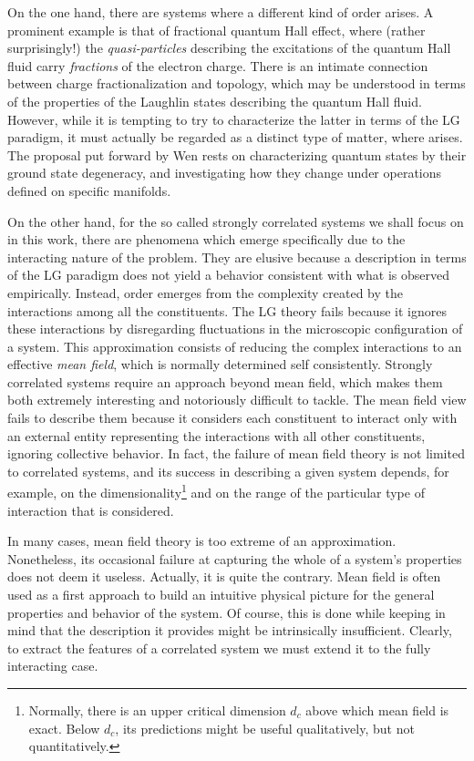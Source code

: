 On the one hand, there are systems where a different kind of order arises.
A prominent example is that of fractional quantum Hall effect, where (rather surprisingly!) the \emph{quasi-particles} describing the excitations of the quantum Hall fluid carry \emph{fractions} of the electron charge.
There is an intimate connection between charge fractionalization and topology, which may be understood in terms of the properties of the Laughlin states describing the quantum Hall fluid. However, while it is tempting to try to characterize the latter in terms of the \acs{LG} paradigm, it must actually be regarded as a distinct type of matter, where  arises.
The proposal put forward by Wen \cite{wen_topological_1990} rests on characterizing quantum states by their ground state degeneracy, and investigating how they change under operations defined on specific manifolds. 

On the other hand, for the so called strongly correlated systems we shall focus on in this work, there are phenomena which emerge specifically due to the interacting nature of the problem.
They are elusive because a description in terms of the \acs{LG} paradigm does not yield a behavior consistent with what is observed empirically.
Instead, order emerges from the complexity created by the interactions among all the constituents.
The \acs{LG} theory fails because it ignores these interactions by disregarding fluctuations in the microscopic configuration of a system.
This approximation consists of reducing the complex interactions to an effective \emph{mean field}, which is normally determined self consistently.
Strongly correlated systems require an approach beyond mean field, which makes them both extremely interesting and notoriously difficult to tackle.
The mean field view fails to describe them because it considers each constituent to interact only with an external entity representing the interactions with all other constituents, ignoring collective behavior.
In fact, the failure of mean field theory is not limited to correlated systems, and its success in describing a given system depends, for example, on the dimensionality\footnote{Normally, there is an upper critical dimension $d_c$ above which mean field is exact. Below $d_c$, its predictions might be useful qualitatively, but not quantitatively.} and on the range of the particular type of interaction that is considered.

In many cases, mean field theory is too extreme of an approximation.
Nonetheless, its occasional failure at capturing the whole of a system's properties does not deem it  useless.
Actually, it is quite the contrary.
Mean field is often used as a first approach to build an intuitive physical picture for the general properties and behavior of the system.
Of course, this is done while keeping in mind that the description it provides might be intrinsically insufficient.
Clearly, to extract the features of a correlated system we must  extend it to the fully interacting case.